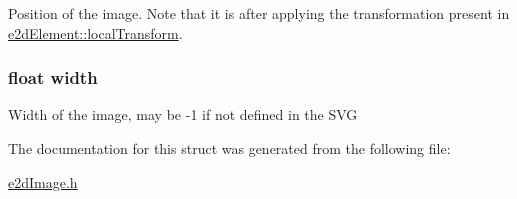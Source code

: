Position of the image. Note that it is after applying the transformation present in \hyperlink{structe2dElement_a52bda732df714953f93c1e6f5f7c7c93}{e2d\-Element\-::local\-Transform}. \hypertarget{structe2dImage_ae426f00e82704fa09578f5446e22d915}{
\subsubsection[{width}]{\setlength{\rightskip}{0pt plus 5cm}float {\bf width}}}\label{structe2dImage_ae426f00e82704fa09578f5446e22d915}
Width of the image, may be -\/1 if not defined in the S\-V\-G 

The documentation for this struct was generated from the following file\-:\begin{DoxyCompactItemize}
\item 
\hyperlink{e2dImage_8h}{e2d\-Image.\-h}\end{DoxyCompactItemize}
